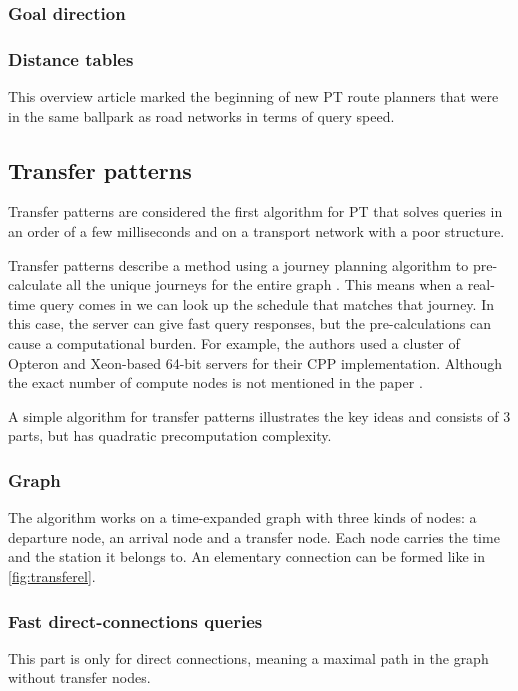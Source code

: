 \subsubsection{Goal direction}
\subsubsection{Distance tables}


This overview article marked the beginning of new PT route planners that were in the same ballpark as road networks in terms of query speed. 
\subsection{Transfer patterns}
Transfer patterns are considered the first algorithm for PT that solves queries in an order of a few milliseconds and on a transport network with a poor structure. 

Transfer patterns describe a method using a journey planning algorithm to pre-calculate all the unique journeys for the entire graph \cite{bast_fast_2010} %
. This means when a real-time query comes in we can look up the schedule that matches that journey. In this case, the server can give fast query responses, but the pre-calculations can cause a computational burden. For example, the authors used a cluster of Opteron and Xeon-based 64-bit servers for their CPP implementation. Although the exact number of compute nodes is not mentioned in the paper \cite{bast_fast_2010}. 


A simple algorithm for transfer patterns illustrates the key ideas and consists of 3 parts, but has quadratic precomputation complexity.
\subsubsection{Graph}
The algorithm works on a time-expanded graph with three kinds of nodes: a departure node, an arrival node and a transfer node. Each node carries the time and the station it belongs to. An elementary connection can be formed like in \autoref{fig:transferel}.

\subsubsection{Fast direct-connections queries}
This part is only for direct connections, meaning a maximal path in the graph without transfer nodes.

